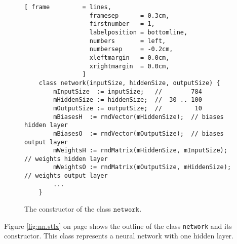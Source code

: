 \begin{figure}[!ht]
\centering
\begin{Verbatim}[ frame         = lines, 
                  framesep      = 0.3cm, 
                  firstnumber   = 1,
                  labelposition = bottomline,
                  numbers       = left,
                  numbersep     = -0.2cm,
                  xleftmargin   = 0.0cm,
                  xrightmargin  = 0.0cm,
                ]
    class network(inputSize, hiddenSize, outputSize) {
        mInputSize  := inputSize;   //        784
        mHiddenSize := hiddenSize;  //  30 .. 100
        mOutputSize := outputSize;  //         10
        mBiasesH  := rndVector(mHiddenSize);  // biases hidden layer
        mBiasesO  := rndVector(mOutputSize);  // biases output layer
        mWeightsH := rndMatrix(mHiddenSize, mInputSize);  // weights hidden layer
        mWeightsO := rndMatrix(mOutputSize, mHiddenSize); // weights output layer
        ...
    }
\end{Verbatim}
\vspace*{-0.3cm}
\caption{The constructor of the class $\mathtt{network}$.}
\label{fig:nn.stlx:network}
\end{figure}
Figure \ref{fig:nn.stlx} on page \pageref{fig:nn.stlx} shows the outline of the class \texttt{network} and its
constructor.  This class represents a neural network with one hidden layer.
